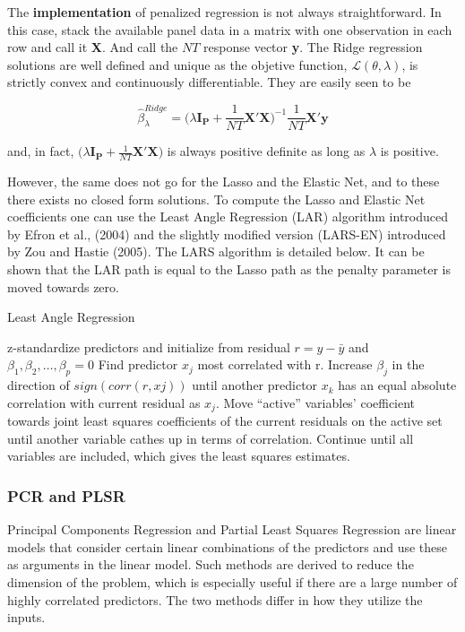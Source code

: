 \documentclass[11pt]{article}
\begin{document}
The \textbf{implementation} of penalized regression is not always straightforward. In this case, stack the available panel data in a matrix with one observation in each row and call it \textbf{X}. And call the \(NT\) response vector \textbf{y}. The Ridge regression solutions are well defined and unique as the objetive function, \(\mathcal{L}(\theta,\lambda)\), is strictly convex and continuously differentiable. They are easily seen to be 

\[
\hat{\beta}_{\lambda}^{Ridge} = \big( \lambda \bm{I_P} + 
\frac{1}{NT} \bm{X'X} \big)^{-1} \frac{1}{NT} \bm{X'y}
\]

and, in fact, \( \big( \lambda \bm{I_P} + \frac{1}{NT} \bm{X'X} \big) \) is always positive definite as long as \(\lambda\) is positive.

However, the same does not go for the Lasso and the Elastic Net, and to these there exists no closed form solutions. To compute the Lasso and Elastic Net coefficients one can use the Least Angle Regression (LAR) algorithm introduced by Efron et al., (2004) and the slightly modified version (LARS-EN) introduced by Zou and Hastie (2005). The LARS algorithm is detailed below. It can be shown that the LAR path is equal to the Lasso path as the penalty parameter is moved towards zero. 

\begin{algorithm}
  \caption{Least Angle Regression}
  \begin{algorithmic}[1]
  \State z-standardize predictors and initialize from residual $r = y - \bar{y}$ and $\beta_1, \beta_2, \dots, \beta_p = 0$
  \State Find predictor $x_j$ most correlated with r.
  \State Increase $\beta_j$ in the direction of $sign(corr(r, xj ))$ until another predictor $x_k$ has an equal absolute correlation with current residual as $x_j$.
  \State Move ``active'' variables' coefficient towards joint least squares coefficients of the current residuals on the active set until another variable cathes up in terms of correlation.
  \State Continue until all variables are included, which gives the least squares estimates.
\end{algorithmic}
\end{algorithm}

\hypertarget{pcr-and-plsr}{%
\subsubsection{PCR and PLSR}\label{pcr-and-plsr}}

Principal Components Regression and Partial Least Squares Regression are
linear models that consider certain linear combinations of the
predictors and use these as arguments in the linear model. Such methods
are derived to reduce the dimension of the problem, which is especially
useful if there are a large number of highly correlated predictors. The
two methods differ in how they utilize the inputs.
\end{document}
